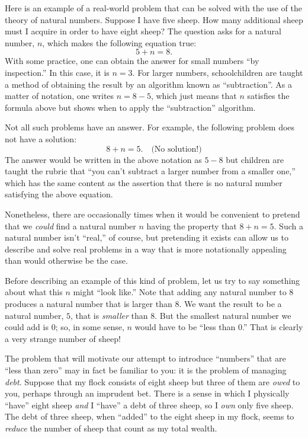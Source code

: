 \documentclass[10pt, a4paper, twocolumn]{article}
\begin{document}
Here is an example of a real-world problem that can be solved with the
use of the theory of natural numbers. Suppose I have five sheep. How
many additional sheep must I acquire in order to have eight sheep? The
question asks for a natural number, $n$, which makes the following
equation true:
\begin{equation*}
5 + n = 8.
\end{equation*}
With some practice, one can obtain the answer for small numbers ``by
inspection.'' In this case, it is $n=3$. For larger numbers,
schoolchildren are taught a method of obtaining the result by an
algorithm known as ``subtraction''. As a matter of notation, one
writes $n = 8 - 5$, which just means that $n$ satisfies the formula
above but shows when to apply the ``subtraction'' algorithm.

Not all such problems have an answer. For example, the following
problem does not have a solution:
\begin{equation*}
8 + n = 5. \quad\text{(No solution!)}
\end{equation*}
The answer would be written in the above notation as $5-8$ but
children are taught the rubric that ``you can't subtract a larger
number from a smaller one,'' which has the same content as the
assertion that there is no natural number satisfying the above
equation.

Nonetheless, there are occasionally times when it would be convenient
to pretend that we \emph{could} find a natural number $n$ having the
property that $8+n=5$. Such a natural number isn't ``real,'' of
course, but pretending it exists can allow us to describe and solve
real problems in a way that is more notationally appealing than would
otherwise be the case.

Before describing an example of this kind of problem, let us try to
say something about what this $n$ might ``look like.'' Note that
adding any natural number to $8$ produces a natural number that is
larger than $8$. We want the result to be a natural number, $5$, that
is \emph{smaller} than $8$. But the smallest natural number we could
add is $0$; so, in some sense, $n$ would have to be ``less than 0.''
That is clearly a very strange number of sheep!

The problem that will motivate our attempt to introduce ``numbers''
that are ``less than zero'' may in fact be familiar to you: it is the
problem of managing \emph{debt}. Suppose that my flock consists of
eight sheep but three of them are \emph{owed} to you, perhaps through
an imprudent bet. There is a sense in which I physically ``have''
eight sheep \emph{and} I ``have'' a debt of three sheep, so I
\emph{own} only five sheep. The debt of three sheep, when ``added'' to
the eight sheep in my flock, seems to \emph{reduce} the number of
sheep that count as my total wealth.
\end{document}
